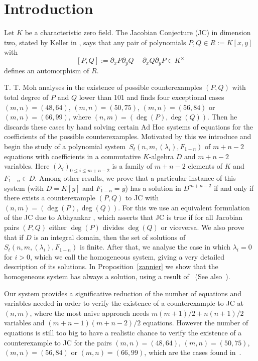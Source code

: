 \documentclass[reqno,a4paper]{amsart}
\theoremstyle{definition}
\theoremstyle{remark}
\begin{document}
\section*{Introduction}
%
Let $K$ be a characteristic zero field. The Jacobian Conjecture (JC) in dimension two, stated
by Keller in \cite{K}, says that any pair of polynomials $P,Q\in R:= K[x,y]$ with
$$
[P,Q]:=\partial_x P \partial_y Q - \partial_x Q \partial_y P\in K^{\times}
$$
defines an automorphism of $R$.

T. T. Moh analyses in \cite{M} the existence of possible counterexamples $(P,Q)$ with total
degree of $P$ and $Q$ lower than 101 and finds four exceptional cases $(m,n)=(48,64)$,
$(m,n)=(50,75)$, $(m,n)=(56,84)$ or $(m,n)=(66,99)$, where $(n,m)=(\deg(P),\deg(Q))$. Then
he discards these cases by hand solving certain Ad Hoc systems of equations for the
coefficients of the possible counterexamples. Motivated by this we introduce and begin the
study of a polynomial system~$S_t(n,m,(\lambda_i),F_{1-n})$ of $m+n-2$ equations with
coefficients in a commutative $K$-algebra $D$ and $m+n-2$ variables. Here
$(\lambda_i)_{0\le i\le m+n-2}$ is a family of $m+n-2$ elements of $K$ and $F_{1-n}\in D$.
Among other results, we prove that a particular instance of this system (with $D=K[y]$ and
$F_{1-n}=y$) has a solution in $D^{m+n-2}$ if and only if there exists a counterexample
$(P,Q)$ to JC  with $(n,m)=(\deg(P),\deg(Q))$. For this we use an equivalent formulation
of the JC due to Abhyankar \cite{A}, which asserts that JC is true if for all Jacobian
pairs $(P,Q)$ either $\deg(P)$ divides $\deg(Q)$ or viceversa.  We also prove that if
$D$ is an integral domain, then the set of solutions of $S_t(n,m,(\lambda_i),F_{1-n})$
is finite. After that, we analyse the case in which $\lambda_i=0$ for $i>0$, which we call
the homogeneous system, giving a very detailed description of its solutions. In
Proposition~\ref{zannier} we show that the homogeneous system has always a solution,
using a result of~\cite{Z} (See also~\cite{APZ}).

 Our system
provides a significative reduction of the number of equations and variables needed in order
to verify the existence of a counterexample to JC at $(n,m)$, where the most naive approach
needs $m(m+1)/2+n(n+1)/2$ variables and $(m+n-1)(m+n-2)/2$ equations. However the number of
equations is still too big to have a realistic chance to verify the existence of a
counterexample to JC for the pairs $(m,n)=(48,64)$, $(m,n)=(50,75)$, $(m,n)=(56,84)$ or $(m,n)=(66,99)$,
which are the cases found in~\cite{M}.
\end{document}
